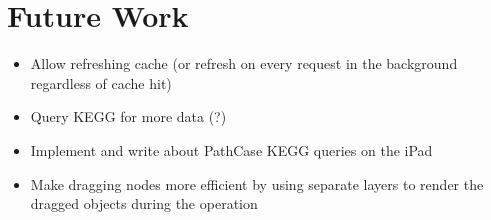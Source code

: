 \section{Future Work}
\label{sect:kegg_future_work}

\begin{itemize}

    \item Allow refreshing cache (or refresh on every request in the background
        regardless of cache hit)

    \item Query KEGG for more data (?)

    \item Implement and write about PathCase KEGG queries on the iPad

    \item Make dragging nodes more efficient by using separate layers to render
        the dragged objects during the operation

\end{itemize}
